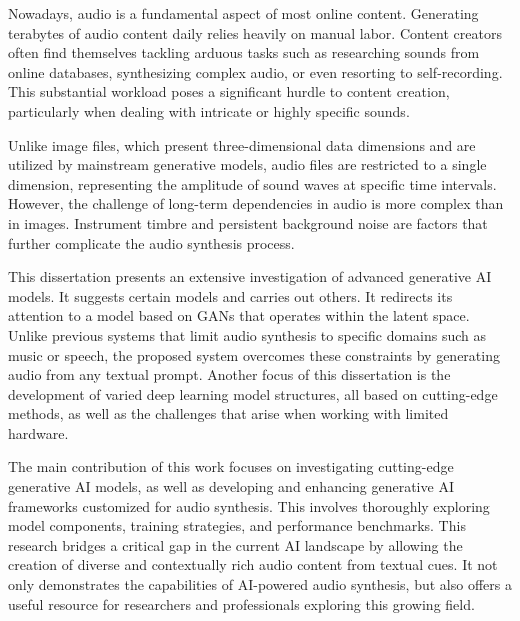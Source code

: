 Nowadays, audio is a fundamental aspect of most online content. Generating terabytes of audio content daily relies heavily on manual labor. Content creators often find themselves tackling arduous tasks such as researching sounds from online databases, synthesizing complex audio, or even resorting to self-recording. This substantial workload poses a significant hurdle to content creation, particularly when dealing with intricate or highly specific sounds.

Unlike image files, which present three-dimensional data dimensions and are utilized by mainstream generative models, audio files are restricted to a single dimension, representing the amplitude of sound waves at specific time intervals. However, the challenge of long-term dependencies in audio is more complex than in images. Instrument timbre and persistent background noise are factors that further complicate the audio synthesis process.

This dissertation presents an extensive investigation of advanced generative AI models. It suggests certain models and carries out others. It redirects its attention to a model based on GANs that operates within the latent space. Unlike previous systems that limit audio synthesis to specific domains such as music or speech, the proposed system overcomes these constraints by generating audio from any textual prompt. Another focus of this dissertation is the development of varied deep learning model structures, all based on cutting-edge methods, as well as the challenges that arise when working with limited hardware.

The main contribution of this work focuses on investigating cutting-edge generative AI models, as well as developing and enhancing generative AI frameworks customized for audio synthesis. This involves thoroughly exploring model components, training strategies, and performance benchmarks. This research bridges a critical gap in the current AI landscape by allowing the creation of diverse and contextually rich audio content from textual cues. It not only demonstrates the capabilities of AI-powered audio synthesis, but also offers a useful resource for researchers and professionals exploring this growing field.

